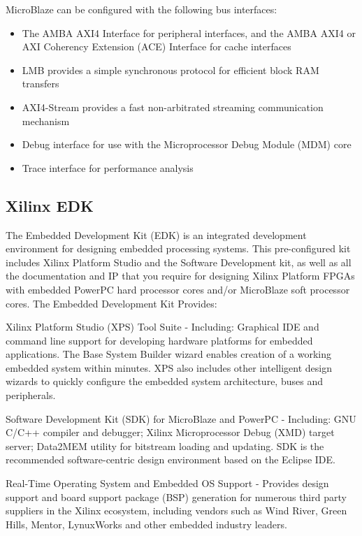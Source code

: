 MicroBlaze can be configured with the following bus interfaces:
\begin{itemize}
	\item The AMBA AXI4 Interface for peripheral interfaces, and the AMBA AXI4 or AXI
	Coherency Extension (ACE) Interface for cache interfaces
	\item LMB provides a simple synchronous protocol for efficient block RAM transfers
	\item AXI4-Stream provides a fast non-arbitrated streaming communication mechanism
	\item Debug interface for use with the Microprocessor Debug Module (MDM) core
	\item Trace interface for performance analysis
\end{itemize}


\subsection{Xilinx EDK}

The Embedded Development Kit (EDK) is an integrated development environment for designing embedded processing systems. This pre-configured kit includes Xilinx Platform Studio and the Software Development kit, as well as all the documentation and IP that you require for designing Xilinx Platform FPGAs with embedded PowerPC hard processor cores and/or MicroBlaze soft processor cores.
The Embedded Development Kit Provides:

Xilinx Platform Studio (XPS) Tool Suite - Including: Graphical IDE and command line support for developing hardware platforms for embedded applications.  The Base System Builder wizard enables creation of a working embedded system within minutes.  XPS also includes other intelligent design wizards to quickly configure the embedded system architecture, buses and peripherals.

Software Development Kit (SDK) for MicroBlaze and PowerPC - Including: GNU C/C++ compiler and debugger; Xilinx Microprocessor Debug (XMD) target server; Data2MEM utility for bitstream loading and updating.  SDK is the recommended software-centric design environment based on the Eclipse IDE.

Real-Time Operating System and Embedded OS Support - Provides design support and board support package (BSP) generation for numerous third party suppliers in the Xilinx ecosystem, including vendors such as Wind River, Green Hills, Mentor, LynuxWorks and other embedded industry leaders.

